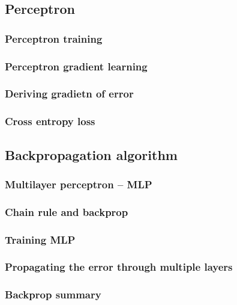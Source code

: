 \documentclass[12pt, letterpaper, twoside]{article}
\begin{document}
\subsection{Perceptron}

\subsubsection{Perceptron training}

\subsubsection{Perceptron gradient learning}

\subsubsection{Deriving gradietn of error}

\subsubsection{Cross entropy loss}


\subsection{Backpropagation algorithm}

\subsubsection{Multilayer perceptron – MLP}

\subsubsection{Chain rule and backprop}

\subsubsection{Training MLP}

\subsubsection{Propagating the error through multiple layers}

\subsubsection{Backprop summary}
\end{document}
